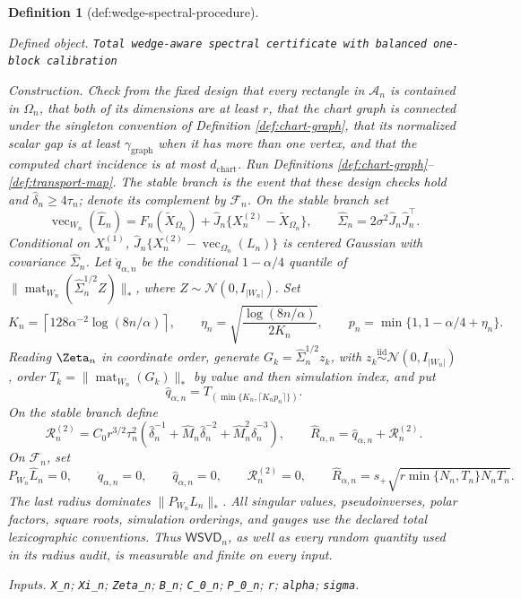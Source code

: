 \documentclass{article}
\newtheorem{definition}{Definition}
\begin{document}
\begin{definition}[def:wedge-spectral-procedure]\label{def:wedge-spectral-procedure}
\par\smallskip\noindent\emph{Defined object.} \texttt{Total wedge-\allowbreak{}aware spectral certificate with balanced one-\allowbreak{}block calibration}
\par\smallskip\noindent\emph{Construction.} Check from the fixed design that every rectangle in \(\mathcal A_n\) is contained in \(\Omega_n\), that both of its dimensions are at least \(r\), that the chart graph is connected under the singleton convention of Definition \ref{def:chart-graph}, that its normalized scalar gap is at least \(\gamma_{\mathrm{graph}}\) when it has more than one vertex, and that the computed chart incidence is at most \(d_{\mathrm{chart}}\). Run Definitions \ref{def:chart-graph}--\ref{def:transport-map}. The stable branch is the event that these design checks hold and \(\widehat\delta_n\ge4\tau_n\); denote its complement by \(\mathcal F_n\). On the stable branch set
\[
\operatorname{vec}_{W_n}(\widehat L_n)
=F_n(\widetilde X_{\Omega_n})
+\widehat J_n\{X_n^{(2)}-\widetilde X_{\Omega_n}\},
\qquad
\widehat\Sigma_n=2\sigma^2\widehat J_n\widehat J_n^{\top}.
\]
Conditional on \(X_n^{(1)}\),
\(\widehat J_n\{X_n^{(2)}-\operatorname{vec}_{\Omega_n}(L_n)\}\)
is centered Gaussian with covariance \(\widehat\Sigma_n\). Let
\(\mathring q_{\alpha,n}\) be the conditional \(1-\alpha/4\) quantile of
\(\|\operatorname{mat}_{W_n}(\widehat\Sigma_n^{1/2}Z)\|_*\), where
\(Z\sim\mathcal N(0,I_{|W_n|})\). Set
\[
K_n=\left\lceil128\alpha^{-2}\log(8n/\alpha)\right\rceil,
\qquad
\eta_n=\sqrt{\frac{\log(8n/\alpha)}{2K_n}},
\qquad
p_n=\min\{1,1-\alpha/4+\eta_n\}.
\]
Reading \(\Zeta_n\) in coordinate order, generate
\(G_k=\widehat\Sigma_n^{1/2}z_k\), with
\(z_k\overset{\mathrm{iid}}{\sim}\mathcal N(0,I_{|W_n|})\), order
\(T_k=\|\operatorname{mat}_{W_n}(G_k)\|_*\) by value and then simulation index, and put
\[
\widehat q_{\alpha,n}
=T_{(\min\{K_n,\lceil K_np_n\rceil\})}.
\]
On the stable branch define
\[
\mathscr R_n^{(2)}
=C_0r^{3/2}\tau_n^2
\left(\widehat\delta_n^{-1}
+\widehat M_n\widehat\delta_n^{-2}
+\widehat M_n^2\widehat\delta_n^{-3}\right),
\qquad
\widehat R_{\alpha,n}
=\widehat q_{\alpha,n}+\mathscr R_n^{(2)}.
\]
On \(\mathcal F_n\), set
\[
P_{W_n}\widehat L_n=0,\qquad
\mathring q_{\alpha,n}=0,\qquad
\widehat q_{\alpha,n}=0,\qquad
\mathscr R_n^{(2)}=0,\qquad
\widehat R_{\alpha,n}
=s_+\sqrt{r\min\{N_n,T_n\}N_nT_n}.
\]
The last radius dominates \(\|P_{W_n}L_n\|_*\). All singular values, pseudoinverses, polar factors, square roots, simulation orderings, and gauges use the declared total lexicographic conventions. Thus \(\mathsf{WSVD}_n\), as well as every random quantity used in its radius audit, is measurable and finite on every input.
\par\smallskip\noindent\emph{Inputs.} \texttt{X\_\allowbreak{}n}; \texttt{Xi\_\allowbreak{}n}; \texttt{Zeta\_\allowbreak{}n}; \texttt{B\_\allowbreak{}n}; \texttt{C\_\allowbreak{}0\_\allowbreak{}n}; \texttt{P\_\allowbreak{}0\_\allowbreak{}n}; \texttt{r}; \texttt{alpha}; \texttt{sigma}.
\end{definition}
\end{document}
